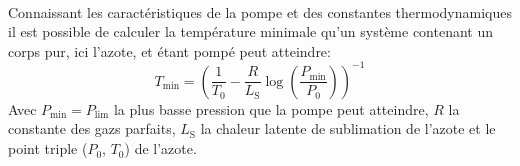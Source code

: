 \\
Connaissant les caractéristiques de la pompe et des constantes thermodynamiques il est possible de calculer la température minimale qu'un système contenant un corps pur, ici l'azote, et étant pompé peut atteindre:
\begin{equation}
    T_\textrm{min} = (\frac{1}{T_\textrm{0}} - \frac{R}{L_\textrm{S}}\log(\frac{P_\textrm{min}}{P_\textrm{0}}))^{-1}
\end{equation}
Avec \(P_\textrm{min} = P_\textrm{lim}\) la plus basse pression que la pompe peut atteindre, \(R\) la constante des gazs parfaits, \(L_\textrm{S}\) la chaleur latente de sublimation de l'azote et le point triple (\(P_0\), \(T_0\)) de l'azote. 
